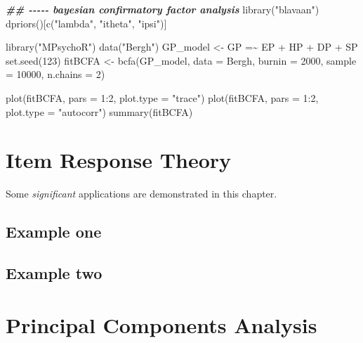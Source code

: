 \documentclass[
]{book}
\newenvironment{Shaded}{\begin{snugshade}}{\end{snugshade}}
\newcommand{\AttributeTok}[1]{\textcolor[rgb]{0.77,0.63,0.00}{#1}}
\newcommand{\DecValTok}[1]{\textcolor[rgb]{0.00,0.00,0.81}{#1}}
\newcommand{\DocumentationTok}[1]{\textcolor[rgb]{0.56,0.35,0.01}{\textbf{\textit{#1}}}}
\newcommand{\FunctionTok}[1]{\textcolor[rgb]{0.00,0.00,0.00}{#1}}
\newcommand{\NormalTok}[1]{#1}
\newcommand{\OtherTok}[1]{\textcolor[rgb]{0.56,0.35,0.01}{#1}}
\newcommand{\SpecialCharTok}[1]{\textcolor[rgb]{0.00,0.00,0.00}{#1}}
\newcommand{\StringTok}[1]{\textcolor[rgb]{0.31,0.60,0.02}{#1}}
\begin{document}
\begin{Shaded}
\begin{Highlighting}[]
\DocumentationTok{\#\# {-}{-}{-}{-}{-} bayesian confirmatory factor analysis}
\FunctionTok{library}\NormalTok{(}\StringTok{"blavaan"}\NormalTok{)}
\FunctionTok{dpriors}\NormalTok{()[}\FunctionTok{c}\NormalTok{(}\StringTok{"lambda"}\NormalTok{, }\StringTok{"itheta"}\NormalTok{, }\StringTok{"ipsi"}\NormalTok{)]}

\FunctionTok{library}\NormalTok{(}\StringTok{"MPsychoR"}\NormalTok{)}
\FunctionTok{data}\NormalTok{(}\StringTok{"Bergh"}\NormalTok{)}
\NormalTok{GP\_model }\OtherTok{\textless{}{-}} \StringTok{\textquotesingle{}GP =\textasciitilde{} EP + HP + DP + SP\textquotesingle{}}
\FunctionTok{set.seed}\NormalTok{(}\DecValTok{123}\NormalTok{)}
\NormalTok{fitBCFA }\OtherTok{\textless{}{-}} \FunctionTok{bcfa}\NormalTok{(GP\_model, }\AttributeTok{data =}\NormalTok{ Bergh, }\AttributeTok{burnin =} \DecValTok{2000}\NormalTok{, }\AttributeTok{sample =} \DecValTok{10000}\NormalTok{, }\AttributeTok{n.chains =} \DecValTok{2}\NormalTok{)}

\FunctionTok{plot}\NormalTok{(fitBCFA, }\AttributeTok{pars =} \DecValTok{1}\SpecialCharTok{:}\DecValTok{2}\NormalTok{, }\AttributeTok{plot.type =} \StringTok{"trace"}\NormalTok{)}
\FunctionTok{plot}\NormalTok{(fitBCFA, }\AttributeTok{pars =} \DecValTok{1}\SpecialCharTok{:}\DecValTok{2}\NormalTok{, }\AttributeTok{plot.type =} \StringTok{"autocorr"}\NormalTok{)}
\FunctionTok{summary}\NormalTok{(fitBCFA)}
\end{Highlighting}
\end{Shaded}

\hypertarget{item-response-theory}{%
\chapter{Item Response Theory}\label{item-response-theory}}

Some \emph{significant} applications are demonstrated in this chapter.

\hypertarget{example-one}{%
\section{Example one}\label{example-one}}

\hypertarget{example-two}{%
\section{Example two}\label{example-two}}

\hypertarget{principal-components-analysis-1}{%
\chapter{Principal Components Analysis}\label{principal-components-analysis-1}}
\end{document}
